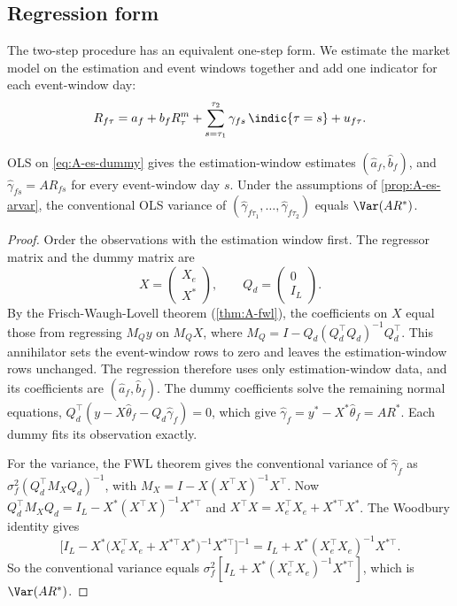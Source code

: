 \subsection{Regression form}\label{sec:A-es-regression}

The two-step procedure has an equivalent one-step form. We estimate the market model on the estimation and event
windows together and add one indicator for each event-window day:
\begin{equation}\label{eq:A-es-dummy}
R_{f\tau}=a_f+b_fR^m_\tau+\sum_{s=\tau_1}^{\tau_2}\gamma_{fs}\,\indic\{\tau=s\}+u_{f\tau}.
\end{equation}

\begin{proposition}\label{prop:A-es-dummy}
OLS on \eqref{eq:A-es-dummy} gives the estimation-window estimates $(\hat a_f,\hat b_f)$, and
$\hat\gamma_{fs}=AR_{fs}$ for every event-window day $s$. Under the assumptions of \cref{prop:A-es-arvar}, the
conventional OLS variance of $(\hat\gamma_{f\tau_1},\dots,\hat\gamma_{f\tau_2})$ equals $\Var(AR^*)$.
\end{proposition}

\begin{proof}
Order the observations with the estimation window first. The regressor matrix and the dummy matrix are
\begin{equation*}
X=\begin{pmatrix}X_e\\X^*\end{pmatrix},\qquad Q_d=\begin{pmatrix}0\\I_L\end{pmatrix}.
\end{equation*}
By the Frisch-Waugh-Lovell theorem
(\cref{thm:A-fwl}), the coefficients on $X$ equal those from regressing $M_{Q}y$ on $M_{Q}X$, where
$M_Q=I-Q_d(Q_d^\top Q_d)^{-1}Q_d^\top$. This annihilator sets the event-window rows to zero and leaves the
estimation-window rows unchanged. The regression therefore uses only estimation-window data, and its coefficients are
$(\hat a_f,\hat b_f)$. The dummy coefficients solve the remaining normal equations,
$Q_d^\top(y-X\hat\theta_f-Q_d\hat\gamma_f)=0$, which give $\hat\gamma_f=y^*-X^*\hat\theta_f=AR^*$. Each dummy fits its
observation exactly.

For the variance, the FWL theorem gives the conventional variance of $\hat\gamma_f$ as
$\sigma_f^2(Q_d^\top M_XQ_d)^{-1}$, with $M_X=I-X(X^\top X)^{-1}X^\top$. Now $Q_d^\top M_XQ_d=I_L-X^*(X^\top X)^{-1}X^{*\top}$
and $X^\top X=X_e^\top X_e+X^{*\top}X^*$. The Woodbury identity gives
\begin{equation*}
\Big[I_L-X^*\big(X_e^\top X_e+X^{*\top}X^*\big)^{-1}X^{*\top}\Big]^{-1}=I_L+X^*(X_e^\top X_e)^{-1}X^{*\top}.
\end{equation*}
So the conventional variance equals $\sigma_f^2[I_L+X^*(X_e^\top X_e)^{-1}X^{*\top}]$, which is $\Var(AR^*)$.
\end{proof}

